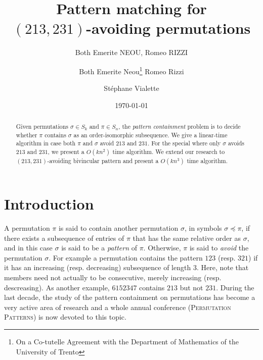 \documentclass[a4paper]{llncs}
\begin{document}

\title{Pattern matching for\\ $(213,231)$-avoiding permutations}
\author{Both Emerite NEOU, Romeo RIZZI}
\date{}

\author{%
	Both Emerite Neou\thanks{On a Co-tutelle  Agreement with the Department of Mathematics of the University of Trento}
  Romeo Rizzi \and
  St\'ephane Vialette
}%

\date{\today}

\maketitle

\begin{abstract}
	Given permutations $\sigma \in S_k$ and $\pi \in S_n$, the
  \emph{pattern containment} problem is to decide whether $\pi$ contains
  $\sigma$ as an order-isomorphic subsequence.
	We give a linear-time algorithm in case both $\pi$ and $\sigma$ avoid
	$213$ and $231$.
	For the special where only $\sigma$ avoids $213$ and $231$, we present a
	$O(kn^2)$ time algorithm. We extend our research to $(213,231)$-avoiding
	bivincular pattern and present a $O(kn^3)$ time algorithm.
\end{abstract}



\section{Introduction}
\label{section:Introduction}

	A permutation $\pi$ is said to contain another permutation $\sigma$,
	in symbols $\sigma \preceq \pi$,
	if there exists a subsequence of entries of $\pi$ that has the same relative
	order as $\sigma$, and in this case $\sigma$ is said to be a
	\emph{pattern} of $\pi$.
	Otherwise, $\pi$ is said to \emph{avoid} the permutation $\sigma$.
	For example a permutation contains the pattern $123$ (resp. $321$) if it has
	an increasing (resp. decreasing) subsequence of length $3$.
	Here, note that members need not actually to be consecutive,
	merely increasing (resp. descreasing).
	As another example,
	$6152347$ contains $213$ but not $231$.
	During the last decade, the study of the pattern containment on permutations has
	become a very active area of research and
	a whole annual conference (\textsc{Permutation Patterns}) is now devoted
	to this topic.
\end{document}
